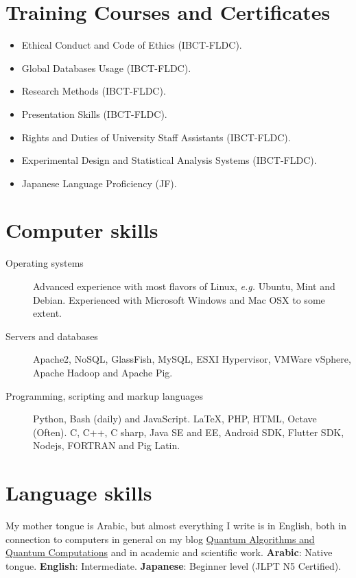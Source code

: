 \documentclass[margin,line,a4paper]{resume}
\begin{document}
\begin{resume}
\section{\mysidestyle Training Courses and Certificates}
\begin{itemize}

\item Ethical Conduct and Code of Ethics (IBCT-FLDC).
\item Global Databases Usage (IBCT-FLDC).
\item Research Methods (IBCT-FLDC).
\item Presentation Skills (IBCT-FLDC).
\item Rights and Duties of University Staff Assistants (IBCT-FLDC).
\item Experimental Design and Statistical Analysis Systems (IBCT-FLDC).
\item Japanese Language Proficiency (JF).

\end{itemize}

    
    

\section{\mysidestyle Computer skills}\vspace{1mm}
\begin{description}
\item[Operating systems] Advanced experience with most flavors of Linux, \textit{e.g.} Ubuntu, Mint and Debian. Experienced with Microsoft Windows and Mac OSX to some extent.
    \item[Servers and databases] Apache2, NoSQL, GlassFish, MySQL, ESXI Hypervisor, VMWare vSphere, Apache Hadoop and Apache Pig.


    \item[Programming, scripting and markup languages] Python, Bash (daily) and JavaScript. \LaTeX, PHP, HTML, Octave (Often). C, C++, C sharp, Java SE and EE, Android SDK, Flutter SDK, Nodejs, FORTRAN and Pig Latin.
\end{description}
    

\section{\mysidestyle Language skills}
    My mother tongue is Arabic, but almost everything I write is in English, both in connection to computers in general on my blog \href{https://qaqcblog.quora.com/}{Quantum Algorithms and Quantum Computations} and in academic and scientific work. \textbf{Arabic}: Native tongue. \textbf{English}: Intermediate. \textbf{Japanese}: Beginner level (JLPT N5 Certified).
   
\end{resume}
\end{document}
